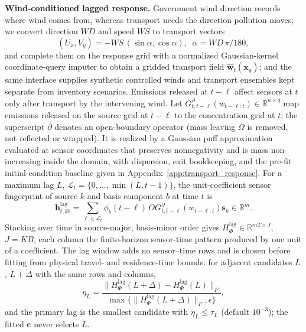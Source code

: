 \noindent\textbf{Wind-conditioned lagged response.}\label{subsec:wind_field_estimation}
Government wind direction records where wind comes from, whereas transport needs
the direction pollution moves; we convert direction \(\mathit{WD}\) and speed
\(\mathit{WS}\) to transport vectors
\begin{equation}
(U_x,V_y)=-\mathit{WS}\,(\sin\alpha,\cos\alpha),\;\;
\alpha=\mathit{WD}\,\pi/180,
\label{eq:wind_direction_conversion}
\end{equation}
and complete them on the response grid with a normalized Gaussian-kernel
coordinate-query imputer to obtain a gridded transport field
\(\widehat{\mathbf w}_t(\mathbf x_g)\); and the same interface
supplies synthetic controlled winds and transport ensembles kept separate from
inventory scenarios.  Emissions released at \(t-\ell\) affect sensors at \(t\)
only after transport by the intervening wind.  Let
\(G_{t,t-\ell}^{\partial}(w_{t-\ell:t})\in \mathbb R^{n\times q}\) map emissions
released on the source grid at \(t-\ell\) to the concentration grid at \(t\); the
superscript \(\partial\) denotes an open-boundary operator (mass leaving
\(\Omega\) is removed, not reflected or wrapped).\label{subsec:plume_response} It
is realized by a Gaussian puff approximation evaluated at sensor coordinates that
preserves nonnegativity and is mass non-increasing inside the domain, with
dispersion, exit bookkeeping, and the pre-fit initial-condition baseline given in
Appendix~\ref{app:transport_response}.  For a maximum lag \(L\),
\(\mathcal L_t=\{0,\ldots,\min(L,t-1)\}\), the unit-coefficient sensor fingerprint
of source \(k\) and basis component \(b\) at time \(t\) is
\begin{equation}
\mathbf h_{t,kb}^{\mathrm{lag}}
= \sum_{\ell\in\mathcal L_t}
\phi_b(t-\ell)\,O G_{t,t-\ell}^{\partial}(w_{t-\ell:t})\mathbf s_k
\in \mathbb R^m.
\label{eq:constructed_response}
\end{equation}
Stacking over time in source-major, basis-minor order gives
\(H_{\Phi}^{\mathrm{lag}}\in \mathbb R^{mT\times J}\), \(J=KB\), each column the
finite-horizon sensor-time pattern produced by one unit of a coefficient.  The lag
window adds no sensor--time rows and is chosen before fitting from physical travel-
and residence-time bounds: for adjacent candidates \(L\), \(L+\Delta\) with the
same rows and columns,
\begin{equation}
\eta_L=
\frac{\|H_{\Phi}^{\mathrm{lag}}(L+\Delta)
-H_{\Phi}^{\mathrm{lag}}(L)\|_F}
{\max\{\|H_{\Phi}^{\mathrm{lag}}(L+\Delta)\|_F,\epsilon\}},
\label{eq:lag_convergence}
\end{equation}
and the primary lag is the smallest candidate with \(\eta_L\le\tau_L\) (default
\(10^{-3}\)); the fitted \(\mathbf c\) never selects \(L\).


